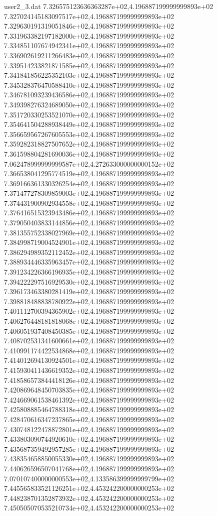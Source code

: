 \begin{filecontents}{user2_3.dat}
7.326575123636363287e+02,4.196887199999999893e+02
7.327024145183097517e+02,4.196887199999999893e+02
7.329630191319051846e+02,4.196887199999999893e+02
7.331963382197182000e+02,4.196887199999999893e+02
7.334851107674942341e+02,4.196887199999999893e+02
7.336902619211266483e+02,4.196887199999999893e+02
7.339514233821871585e+02,4.196887199999999893e+02
7.341841856225352103e+02,4.196887199999999893e+02
7.345328376470588410e+02,4.196887199999999893e+02
7.346781093239436586e+02,4.196887199999999893e+02
7.349398276324689050e+02,4.196887199999999893e+02
7.351720330253521070e+02,4.196887199999999893e+02
7.354641504288938449e+02,4.196887199999999893e+02
7.356659567267605553e+02,4.196887199999999893e+02
7.359282318827507652e+02,4.196887199999999893e+02
7.361598804281690036e+02,4.196887199999999893e+02
7.062478999999999587e+02,4.272633000000000152e+02
7.366538041295774519e+02,4.196887199999999893e+02
7.369166361330326254e+02,4.196887199999999893e+02
7.371477278309859003e+02,4.196887199999999893e+02
7.374431900902934558e+02,4.196887199999999893e+02
7.376416515323943486e+02,4.196887199999999893e+02
7.379050403833144856e+02,4.196887199999999893e+02
7.381355752338027969e+02,4.196887199999999893e+02
7.384998719004524901e+02,4.196887199999999893e+02
7.386294989352112452e+02,4.196887199999999893e+02
7.388934446335963457e+02,4.196887199999999893e+02
7.391234226366196935e+02,4.196887199999999893e+02
7.394222297516929530e+02,4.196887199999999893e+02
7.396173463380281419e+02,4.196887199999999893e+02
7.398818488838780922e+02,4.196887199999999893e+02
7.401112700394365902e+02,4.196887199999999893e+02
7.406276448181818068e+02,4.196887199999999893e+02
7.406051937408450385e+02,4.196887199999999893e+02
7.408702531341600661e+02,4.196887199999999893e+02
7.410991174422534868e+02,4.196887199999999893e+02
7.414012694130924501e+02,4.196887199999999893e+02
7.415930411436619352e+02,4.196887199999999893e+02
7.418586573844418126e+02,4.196887199999999893e+02
7.420869648450703835e+02,4.196887199999999893e+02
7.424669061538461392e+02,4.196887199999999893e+02
7.425808885464788318e+02,4.196887199999999893e+02
7.428470616347237865e+02,4.196887199999999893e+02
7.430748122478872801e+02,4.196887199999999893e+02
7.433803090744920610e+02,4.196887199999999893e+02
7.435687359492957285e+02,4.196887199999999893e+02
7.438354658850055330e+02,4.196887199999999893e+02
7.440626596507041768e+02,4.196887199999999893e+02
7.070107400000000553e+02,4.133586399999999799e+02
7.445565833521126251e+02,4.453242200000000253e+02
7.448238701352873932e+02,4.453242200000000253e+02
7.450505070535210734e+02,4.453242200000000253e+02

\end{filecontents}
